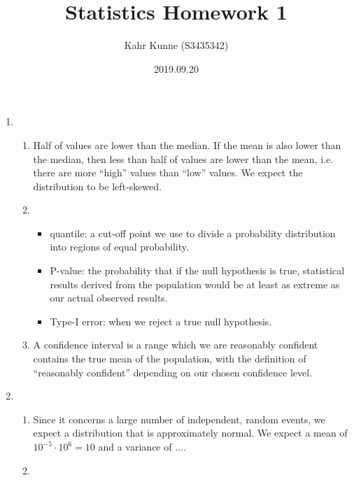 \documentclass{article}
\begin{document}
\title{Statistics Homework 1}
\author{Kahr Kunne (S3435342)}
\date{2019.09.20}

\maketitle

\begin{enumerate}
\item
  \begin{enumerate}
  \item Half of values are lower than the median. If the mean is also lower
    than the median, then less than half of values are lower than the mean,
    i.e. there are more ``high'' values than ``low'' values. We expect the
    distribution to be left-skewed.
  \item \begin{itemize}
    \item quantile: a cut-off point we use to divide a probability
      distribution into regions of equal probability.
    \item P-value: the probability that if the null hypothesis is true,
      statistical results derived from the population would be at least
      as extreme as our actual observed results.
    \item Type-I error: when we reject a true null hypothesis.
    \end{itemize}
  \item A confidence interval is a range which we are reasonably confident
    contains the true mean of the population, with the definition of
    ``reasonably confident'' depending on our chosen confidence level.
  \end{enumerate}

\item
  \begin{enumerate}
    \item Since it concerns a large number of independent, random events, we
      expect a distribution that is approximately normal. We expect a mean of
      $10^{-5} \cdot 10^6 = 10$ and a variance of $...$.
      \item 
  \end{enumerate}



\end{enumerate}
\end{document}
